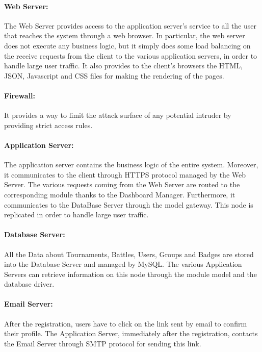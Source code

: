 \paragraph{Web Server: }
The Web Server provides access to the application server’s service to all the user that reaches the system through a web browser. In particular, the web server does not execute any business logic, but it simply does some load balancing on the receive requests from the client to the various application servers, in order to handle large user traffic.
It also provides to the client's browsers the HTML, JSON, Javascript and CSS files for making the rendering of the pages.

\paragraph{Firewall: }
It provides a way to limit the attack surface of any potential intruder by providing strict access rules.

\paragraph{Application Server: }
The application server contains the business logic of the entire system. Moreover, it communicates to the client through HTTPS protocol managed by the Web Server. The various requests coming from the Web Server are routed to the corresponding module thanks to the Dashboard Manager.
Furthermore, it communicates to the DataBase Server through the model gateway. This node is replicated in order to handle large user traffic.

\paragraph{Database Server: }
All the Data about Tournaments, Battles, Users, Groups and Badges are stored into the Database Server and managed by MySQL.
The various Application Servers can retrieve information on this node through the module model and the database driver.

\paragraph{Email Server: }
After the registration, users have to click on the link sent by email to confirm their profile. The Application Server, immediately after the registration, contacts the Email Server through SMTP protocol for sending this link.


